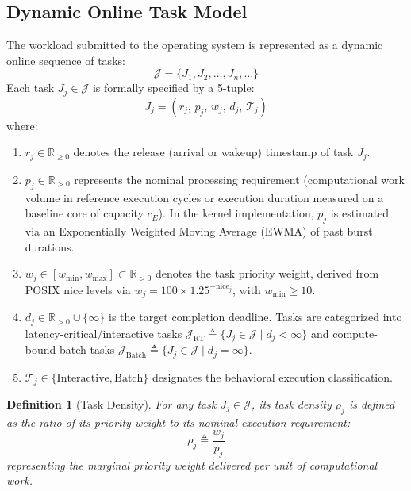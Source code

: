 \documentclass[conference]{IEEEtran}
\newtheorem{definition}{Definition}
\begin{document}
\subsection{Dynamic Online Task Model}
The workload submitted to the operating system is represented as a dynamic online sequence of tasks:
\begin{equation}
\mathcal{J} = \{J_1, J_2, \dots, J_n, \dots\}
\end{equation}
Each task $J_j \in \mathcal{J}$ is formally specified by a 5-tuple:
\begin{equation}
J_j = \left( r_j, \, p_j, \, w_j, \, d_j, \, \mathcal{T}_j \right)
\end{equation}
where:
\begin{enumerate}
    \item $r_j \in \mathbb{R}_{\ge 0}$ denotes the release (arrival or wakeup) timestamp of task $J_j$.
    \item $p_j \in \mathbb{R}_{> 0}$ represents the nominal processing requirement (computational work volume in reference execution cycles or execution duration measured on a baseline core of capacity $c_E$). In the kernel implementation, $p_j$ is estimated via an Exponentially Weighted Moving Average (EWMA) of past burst durations.
    \item $w_j \in [w_{\min}, w_{\max}] \subset \mathbb{R}_{> 0}$ denotes the task priority weight, derived from POSIX nice levels via $w_j = 100 \times 1.25^{-\mathrm{nice}_j}$, with $w_{\min} \ge 10$.
    \item $d_j \in \mathbb{R}_{> 0} \cup \{\infty\}$ is the target completion deadline. Tasks are categorized into latency-critical/interactive tasks $\mathcal{J}_{\mathrm{RT}} \triangleq \{J_j \in \mathcal{J} \mid d_j < \infty\}$ and compute-bound batch tasks $\mathcal{J}_{\mathrm{Batch}} \triangleq \{J_j \in \mathcal{J} \mid d_j = \infty\}$.
    \item $\mathcal{T}_j \in \{\text{Interactive}, \text{Batch}\}$ designates the behavioral execution classification.
\end{enumerate}

\begin{definition}[Task Density]
\label{def:density}
For any task $J_j \in \mathcal{J}$, its task density $\rho_j$ is defined as the ratio of its priority weight to its nominal execution requirement:
\begin{equation}
\rho_j \triangleq \frac{w_j}{p_j}
\end{equation}
representing the marginal priority weight delivered per unit of computational work.
\end{definition}
\end{document}
